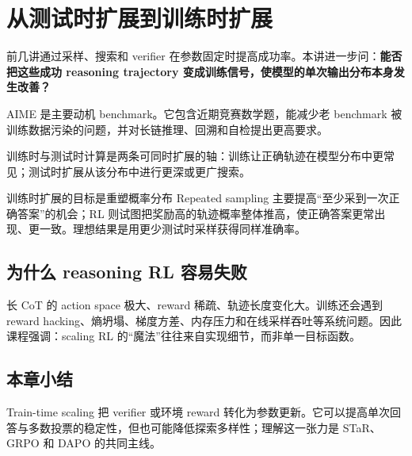 \section{从测试时扩展到训练时扩展}

前几讲通过采样、搜索和 verifier 在参数固定时提高成功率。本讲进一步问：\textbf{能否把这些成功 reasoning trajectory 变成训练信号，使模型的单次输出分布本身发生改善？}

AIME 是主要动机 benchmark。它包含近期竞赛数学题，能减少老 benchmark 被训练数据污染的问题，并对长链推理、回溯和自检提出更高要求。


训练时与测试时计算是两条可同时扩展的轴：训练让正确轨迹在模型分布中更常见；测试时扩展从该分布中进行更深或更广搜索。


\begin{importantbox}{训练时扩展的目标是重塑概率分布}
Repeated sampling 主要提高“至少采到一次正确答案”的机会；RL 则试图把奖励高的轨迹概率整体推高，使正确答案更常出现、更一致。理想结果是用更少测试时采样获得同样准确率。
\end{importantbox}

\subsection{为什么 reasoning RL 容易失败}

长 CoT 的 action space 极大、reward 稀疏、轨迹长度变化大。训练还会遇到 reward hacking、熵坍塌、梯度方差、内存压力和在线采样吞吐等系统问题。因此课程强调：scaling RL 的“魔法”往往来自实现细节，而非单一目标函数。

\subsection{本章小结}

Train-time scaling 把 verifier 或环境 reward 转化为参数更新。它可以提高单次回答与多数投票的稳定性，但也可能降低探索多样性；理解这一张力是 STaR、GRPO 和 DAPO 的共同主线。

